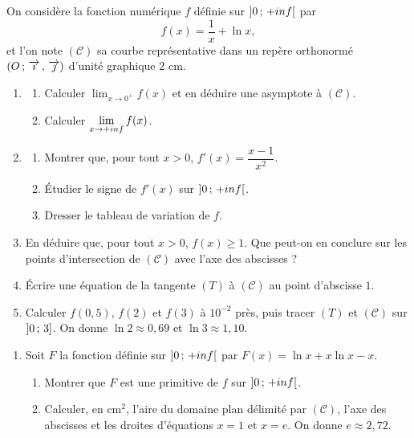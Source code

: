 \begin{devoirsurveille}
On considère la fonction numérique $f$ définie sur
$\left]0\,;\,+inf\right[$ par
\[
  f(x) = \frac{1}{x}+\ln x ,
\]
et l'on note $(\mathcal C)$ sa courbe représentative dans un repère
orthonormé $\left(O\,;\,\overrightarrow{\imath}\,,\,\overrightarrow{\jmath}\right)$ d'unité graphique $2$ cm.

\begin{enumerate}[label=\textbf{\arabic*.}, leftmargin=*, itemsep=0.25em]
  \item \begin{enumerate}[label=\textbf{\alph*)}, leftmargin=1.4em, itemsep=0.15em]
      \item Calculer $\displaystyle\lim_{x \to 0^{+}} f(x)$ et en déduire
            une asymptote à $(\mathcal C)$. 
      \item Calculer $\limpinf f(x)$. 
    \end{enumerate}
  \item \begin{enumerate}[label=\textbf{\alph*)}, leftmargin=1.4em, itemsep=0.15em]
      \item Montrer que, pour tout $x>0$,
            $f'(x) = \dfrac{x-1}{x^{2}}$. 
      \item Étudier le signe de $f'(x)$ sur $\left]0\,;\,+inf\right[$.
      \item Dresser le tableau de variation de $f$. 
    \end{enumerate}
  \item En déduire que, pour tout $x>0$, $f(x) \geq 1$. Que peut-on en
        conclure sur les points d'intersection de $(\mathcal C)$ avec l'axe
        des abscisses ? 
  \item Écrire une équation de la tangente $(T)$ à $(\mathcal C)$ au point
        d'abscisse $1$. 
  \item Calculer $f(0{,}5)$, $f(2)$ et $f(3)$ à $10^{-2}$ près, puis tracer
        $(T)$ et $(\mathcal C)$ sur $\left]0\,;\,3\right]$. On donne
        $\ln 2 \approx 0{,}69$ et $\ln 3 \approx 1{,}10$.
\end{enumerate}

\begin{enumerate}[label=\textbf{\arabic*.}, leftmargin=*, itemsep=0.25em, start=6]
  \item Soit $F$ la fonction définie sur $\left]0\,;\,+inf\right[$ par
        $F(x) = \ln x+x\ln x-x$.
    \begin{enumerate}[label=\textbf{\alph*)}, leftmargin=1.4em, itemsep=0.15em]
      \item Montrer que $F$ est une primitive de $f$ sur
            $\left]0\,;\,+inf\right[$. 
      \item Calculer, en $\text{cm}^{2}$, l'aire du domaine plan délimité
            par $(\mathcal C)$, l'axe des abscisses et les droites
            d'équations $x = 1$ et $x = e$. On donne $e \approx 2{,}72$.
    \end{enumerate}
\end{enumerate}
\end{devoirsurveille}

